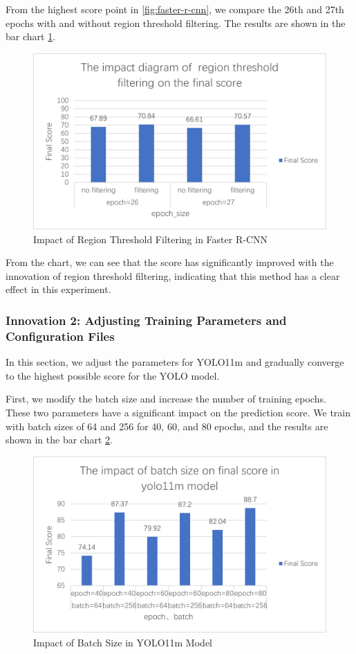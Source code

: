 From the highest score point in \cref{fig:faster-r-cnn}, we compare the 26th and 27th epochs with and without region threshold filtering. The results are shown in the bar chart \cref{fig:faster-r-cnn-conf}.
\begin{figure}[t]
  \centering
  \includegraphics[width=0.8\linewidth]{./graphs/图片5.png}

  \caption{Impact of Region Threshold Filtering in Faster R-CNN}
  \label{fig:faster-r-cnn-conf}
\end{figure}

From the chart, we can see that the score has significantly improved with the innovation of region threshold filtering, indicating that this method has a clear effect in this experiment.

\subsubsection{Innovation 2: Adjusting Training Parameters and Configuration Files}
In this section, we adjust the parameters for YOLO11m and gradually converge to the highest possible score for the YOLO model.

First, we modify the batch size and increase the number of training epochs. These two parameters have a significant impact on the prediction score. We train with batch sizes of 64 and 256 for 40, 60, and 80 epochs, and the results are shown in the bar chart \cref{fig:yolo-batchsize}.
\begin{figure}[t]
  \centering
  \includegraphics[width=0.8\linewidth]{./graphs/图片8.png}

  \caption{Impact of Batch Size in YOLO11m Model}
  \label{fig:yolo-batchsize}
\end{figure}

